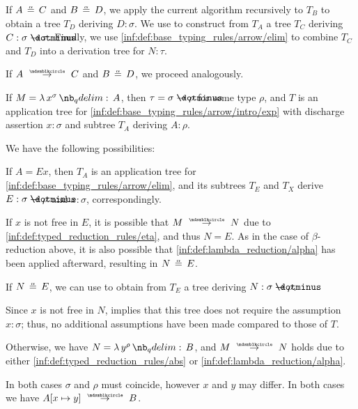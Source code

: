 \begin{algorithm}
\begin{thmenum}
\begin{thmenum}
      If \( A \aequiv C \) and \( B \aequiv D \), we apply the current algorithm recursively to \( T_B \) to obtain a tree \( T_D \) deriving \( D: \sigma \). We use  to construct from \( T_A \) a tree \( T_C \) deriving \( C: \sigma \synimplies \tau \). Finally, we use \ref{inf:def:base_typing_rules/arrow/elim} to combine \( T_C \) and \( T_D \) into a derivation tree for \( N: \tau \).

      If \( A \pred C \) and \( B \aequiv D \), we proceed analogously.
    \end{thmenum}

     If \( M = \qabs {x^\sigma} A \), then \( \tau = \sigma \synimplies \rho \) for some type \( \rho \), and \( T \) is an application tree for \ref{inf:def:base_typing_rules/arrow/intro/exp} with discharge assertion \( x: \sigma \) and subtree \( T_A \) deriving \( A: \rho \).

    We have the following possibilities:
    \begin{thmenum}
       If \( A = Ex \), then \( T_A \) is an application tree for \ref{inf:def:base_typing_rules/arrow/elim}, and its subtrees \( T_E \) and \( T_X \) derive \( E: \sigma \synimplies \rho \) and \( x: \sigma \), correspondingly.

      If \( x \) is not free in \( E \), it is possible that \( M \pred N \) due to \ref{inf:def:typed_reduction_rules/eta}, and thus \( N = E \). As in the case of \( \beta \)-reduction above, it is also possible that \ref{inf:def:lambda_reduction/alpha} has been applied afterward, resulting in \( N \aequiv E \).

      If \( N \aequiv E \), we can use  to obtain from \( T_E \) a tree deriving \( N: \sigma \synimplies \rho \).

      Since \( x \) is not free in \( N \),  implies that this tree does not require the assumption \( x: \sigma \); thus, no additional assumptions have been made compared to those of \( T \).

       Otherwise, we have \( N = \qabs {y^\rho} B \), and \( M \pred N \) holds due to either \ref{inf:def:typed_reduction_rules/abs} or \ref{inf:def:lambda_reduction/alpha}.

      In both cases \( \sigma \) and \( \rho \) must coincide, however \( x \) and \( y \) may differ. In both cases we have \( A[x \mapsto y] \pred B \).


\end{thmenum}
\end{thmenum}
\end{algorithm}
